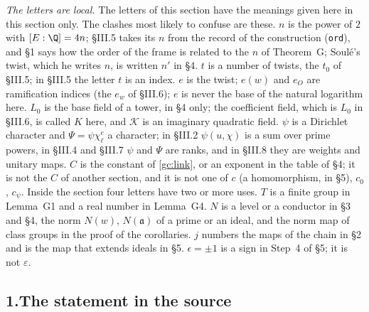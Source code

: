 \documentclass[11pt,letterpaper]{article}
\begin{document}
\emph{The letters are local.} The letters of this section have the meanings given here in this section
only. The clashes most likely to confuse are these. $n$ is the power of $2$ with $[E:\Q]=4n$; \S III.5
takes its $n$ from the record of the construction (\texttt{ord}), and \S1 says how the order of the frame
is related to the $n$ of Theorem~G; Soul\'e's twist, which he writes $n$, is written $n'$ in \S4. $t$ is a
number of twists, the $t_0$ of \S III.5; in \S III.5 the letter $t$ is an index. $e$ is the twist; $e(w)$
and $e_O$ are ramification indices (the $e_w$ of \S III.6); $e$ is never the base of the natural logarithm
here. $L_0$ is the base field of a tower, in \S4 only; the coefficient field, which is $L_0$ in \S III.6, is
called $K$ here, and $\mathcal K$ is an imaginary quadratic field. $\psi$ is a Dirichlet character and
$\Psi=\psi\chi_\ell^{e}$ a character; in \S III.2 $\psi(u,\chi)$ is a sum over prime powers, in \S III.4 and
\S III.7 $\psi$ and $\Psi$ are ranks, and in \S III.8 they are weights and unitary maps. $C$ is the
constant of \eqref{gc:link}, or an exponent in the table of \S4; it is not the $C$ of another section, and
it is not one of $c$ (a homomorphism, in \S5), $c_0$, $c_\psi$. Inside the section four letters have two or
more uses. $T$ is a finite group in Lemma~G1 and a real number in Lemma~G4. $N$ is a level or a conductor
in \S3 and \S4, the norm $N(w)$, $N(\mathfrak a)$ of a prime or an ideal, and the norm map of class groups
in the proof of the corollaries. $j$ numbers the maps of the chain in \S2 and is the map that extends
ideals in \S5. $\epsilon=\pm1$ is a sign in Step~4 of \S5; it is not $\varepsilon$.

\subsection*{1.\quad The statement in the source}
\end{document}
